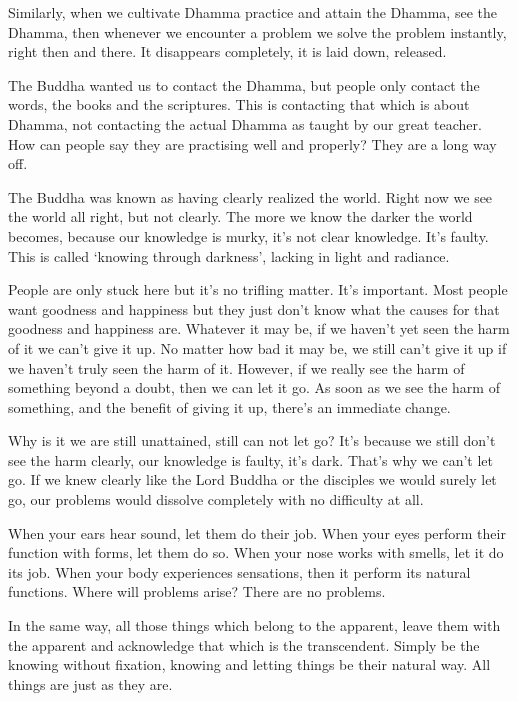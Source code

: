 Similarly, when we cultivate Dhamma practice and attain the Dhamma, see the Dhamma, then whenever we encounter a problem we solve the problem instantly, right then and there. It disappears completely, it is laid down, released.

The Buddha wanted us to contact the Dhamma, but people only contact the words, the books and the scriptures. This is contacting that which is about Dhamma, not contacting the actual Dhamma as taught by our great teacher. How can people say they are practising well and properly? They are a long way off.

The Buddha was known as  having clearly realized the world. Right now we see the world all right, but not clearly. The more we know the darker the world becomes, because our knowledge is murky, it's not clear knowledge. It's faulty. This is called `knowing through darkness', lacking in light and radiance.

People are only stuck here but it's no trifling matter. It's important. Most people want goodness and happiness but they just don't know what the causes for that goodness and happiness are. Whatever it may be, if we haven't yet seen the harm of it we can't give it up. No matter how bad it may be, we still can't give it up if we haven't truly seen the harm of it. However, if we really see the harm of something beyond a doubt, then we can let it go. As soon as we see the harm of something, and the benefit of giving it up, there's an immediate change.

Why is it we are still unattained, still can not let go? It's because we still don't see the harm clearly, our knowledge is faulty, it's dark. That's why we can't let go. If we knew clearly like the Lord Buddha or the  disciples we would surely let go, our problems would dissolve completely with no difficulty at all.

When your ears hear sound, let them do their job. When your eyes perform their function with forms, let them do so. When your nose works with smells, let it do its job. When your body experiences sensations, then it perform its natural functions. Where will problems arise? There are no problems.

In the same way, all those things which belong to the apparent, leave them with the apparent and acknowledge that which is the transcendent. Simply be the  knowing without fixation, knowing and letting things be their natural way. All things are just as they are.

